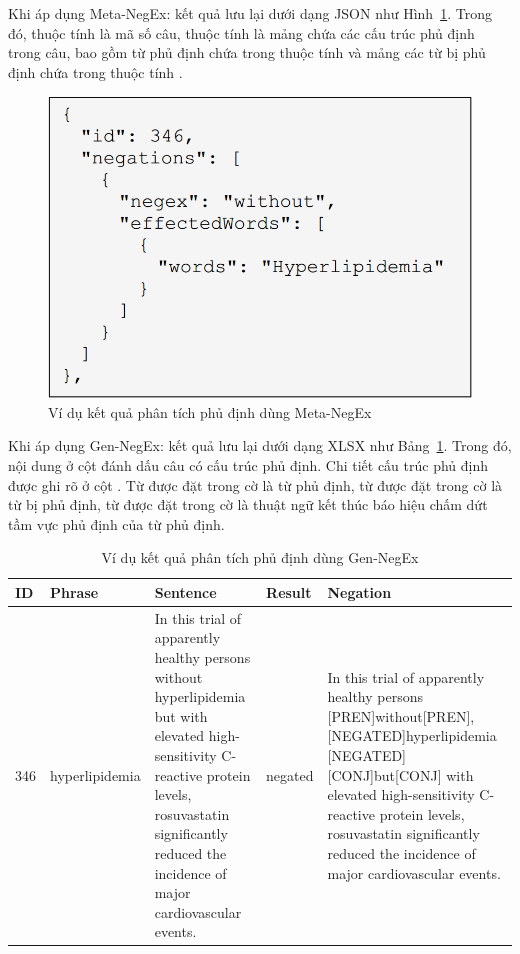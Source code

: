 Khi áp dụng Meta-NegEx: kết quả lưu lại dưới dạng JSON như Hình~\ref{fig:Meta-NegEx}. Trong đó, thuộc tính  là mã số câu, thuộc tính  là mảng chứa các cấu trúc phủ định trong câu, bao gồm từ phủ định chứa trong thuộc tính  và mảng các từ bị phủ định chứa trong thuộc tính .\\

\begin{figure}[h]
\centering
\includegraphics[scale=0.35]{../hinh/JSON.png}
\caption{Ví dụ kết quả phân tích phủ định dùng Meta-NegEx}
\label{fig:Meta-NegEx}
\end{figure}

Khi áp dụng Gen-NegEx: kết quả lưu lại dưới dạng XLSX như Bảng~\ref{table:Gen-NegEx}. Trong đó, nội dung  ở cột  đánh dấu câu có cấu trúc phủ định. Chi tiết cấu trúc phủ định được ghi rõ ở cột . Từ được đặt trong cờ \xquote{[PREN]} là từ phủ định, từ được đặt trong cờ \xquote{[NEGATED]} là từ bị phủ định, từ được đặt trong cờ \xquote{[CONJ]} là thuật ngữ kết thúc báo hiệu chấm dứt tầm vực phủ định của từ phủ định.\\

\begin{table}[h]
\centering
\caption{Ví dụ kết quả phân tích phủ định dùng Gen-NegEx}
\label{table:Gen-NegEx}
\begin{tabular}{|l|l|m{}|l|m{}|}
\hline
ID & Phrase & Sentence & Result & Negation \\ \hline
346 & hyperlipidemia & In this trial of apparently healthy persons without hyperlipidemia but with elevated high-sensitivity C-reactive protein levels, rosuvastatin significantly reduced the incidence of major cardiovascular events. & negated & In this trial of apparently healthy persons {[}PREN{]}without{[}PREN{]}, {[}NEGATED{]}hyperlipidemia {[}NEGATED{]} {[}CONJ{]}but{[}CONJ{]} with elevated high-sensitivity C-reactive protein levels, rosuvastatin significantly reduced the incidence of major cardiovascular events. \\ \hline
\end{tabular}
\end{table}


